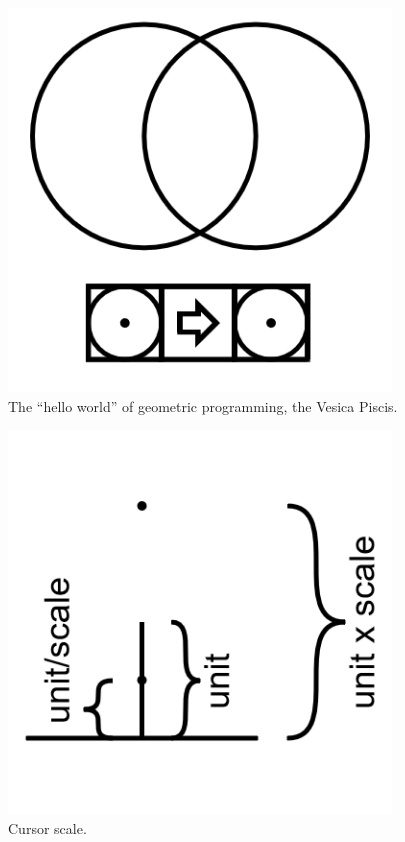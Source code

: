 \begin{figure}
	\centering
	\includegraphics[width=4in]{figures/web2d/vesicapiscis.png}
	\caption[vesicapiscis]
	{The ``hello world'' of geometric programming, the Vesica Piscis.}
\end{figure}
\begin{figure}
	\centering
	\includegraphics[width=4in]{figures/web2d/cursorscale1.png}
	\caption[cursorscale]
	{Cursor scale.}
\end{figure}
